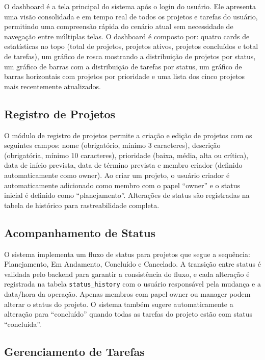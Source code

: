 \documentclass[a4paper,12pt,oneside]{article}
\begin{document}
O dashboard é a tela principal do sistema após o login do usuário. Ele apresenta uma visão consolidada e em tempo real de todos os projetos e tarefas do usuário, permitindo uma compreensão rápida do cenário atual sem necessidade de navegação entre múltiplas telas. O dashboard é composto por: quatro cards de estatísticas no topo (total de projetos, projetos ativos, projetos concluídos e total de tarefas), um gráfico de rosca mostrando a distribuição de projetos por status, um gráfico de barras com a distribuição de tarefas por status, um gráfico de barras horizontais com projetos por prioridade e uma lista dos cinco projetos mais recentemente atualizados.

\subsection{Registro de Projetos}

O módulo de registro de projetos permite a criação e edição de projetos com os seguintes campos: nome (obrigatório, mínimo 3 caracteres), descrição (obrigatória, mínimo 10 caracteres), prioridade (baixa, média, alta ou crítica), data de início prevista, data de término prevista e membro criador (definido automaticamente como owner). Ao criar um projeto, o usuário criador é automaticamente adicionado como membro com o papel ``owner'' e o status inicial é definido como ``planejamento''. Alterações de status são registradas na tabela de histórico para rastreabilidade completa.

\subsection{Acompanhamento de Status}

O sistema implementa um fluxo de status para projetos que segue a sequência: Planejamento, Em Andamento, Concluído e Cancelado. A transição entre status é validada pelo backend para garantir a consistência do fluxo, e cada alteração é registrada na tabela \texttt{status\_history} com o usuário responsável pela mudança e a data/hora da operação. Apenas membros com papel owner ou manager podem alterar o status do projeto. O sistema também sugere automaticamente a alteração para ``concluído'' quando todas as tarefas do projeto estão com status ``concluída''.

\subsection{Gerenciamento de Tarefas}
\end{document}
